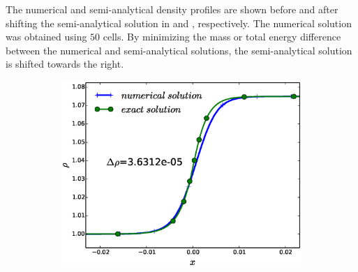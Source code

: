 \documentclass[times,doublespace]{fldauth}%
\begin{document}
The numerical and semi-analytical density profiles are shown before and after shifting the semi-analytical solution in  and , respectively. The numerical solution was obtained using $50$ cells. By minimizing the mass or total energy difference between the numerical and semi-analytical solutions, the semi-analytical solution is shifted towards the right.
%
\begin{figure}[h]
    \centering   
    \begin{subfigure}{0.49\textwidth}
    \includegraphics[width=\linewidth]{figures/cst-xs/mach-1p05/mach-1p05-density-nel-50-zero-shift.eps}
    \caption{}\label{fig:mach-1p05-cst-xs-density-no-shift}
    \end{subfigure}
    \begin{subfigure}{0.49\textwidth}

\end{subfigure}
\end{figure}
\end{document}
